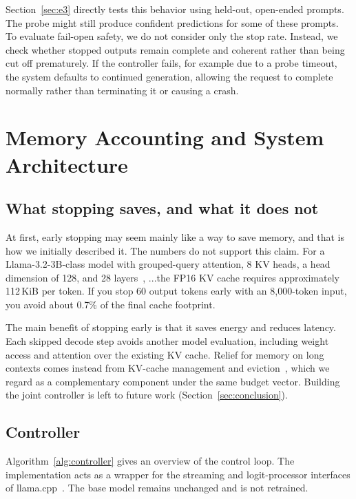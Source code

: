 \documentclass[review,12pt]{elsarticle}
\begin{document}
Section~\ref{sec:e3} directly tests this behavior using held-out, open-ended prompts. The probe might still produce confident predictions for some of these prompts. To evaluate fail-open safety, we do not consider only the stop rate.
Instead, we check whether stopped outputs remain complete and coherent rather than being cut off prematurely. If the controller fails, for example due to a probe timeout, the system defaults to continued generation, allowing the request to complete normally rather than terminating it or causing a crash.

\section{Memory Accounting and System Architecture}
\label{sec:memory}

\subsection{What stopping saves, and what it does not}
At first, early stopping may seem mainly like a way to save memory, and that
is how we initially described it. The numbers do not support this claim.
For a Llama-3.2-3B-class model with grouped-query attention, 8 KV heads,
a head dimension of 128, and 28 layers~\cite{llama32config}, ...the FP16 KV cache requires approximately 112\,KiB per token. If you stop 60 output
tokens early with an 8{,}000-token input, you avoid about 0.7\% of the
final cache footprint.

The main benefit of stopping early is that it saves energy and reduces
latency. Each skipped decode step avoids another model evaluation, including
weight access and attention over the existing KV cache. Relief for memory
on long contexts comes instead from KV-cache management and
eviction~\cite{xiao2024streamingllm,zhang2023h2o}, which we regard as a
complementary component under the same budget vector. Building the joint
controller is left to future work (Section~\ref{sec:conclusion}).

\subsection{Controller}
Algorithm~\ref{alg:controller} gives an overview of the control loop.
The implementation acts as a wrapper for the streaming and logit-processor interfaces
of llama.cpp~\cite{llamacpp}. The base model remains unchanged and is not retrained. 
\end{document}
